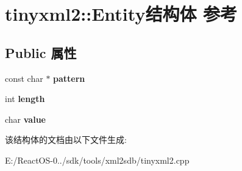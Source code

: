 \hypertarget{structtinyxml2_1_1_entity}{}\section{tinyxml2\+:\+:Entity结构体 参考}
\label{structtinyxml2_1_1_entity}
\subsection*{Public 属性}
\begin{DoxyCompactItemize}
\item 
\mbox{\label{structtinyxml2_1_1_entity_ab330f5d665d29bfc811ecfa76315894b}} 
const char $\ast$ {\bfseries pattern}
\item 
\mbox{\label{structtinyxml2_1_1_entity_a25e2b57cb59cb4fa68f283d7cb570f21}} 
int {\bfseries length}
\item 
\mbox{\label{structtinyxml2_1_1_entity_a7334e81e33b4615655a403711b24f3ed}} 
char {\bfseries value}
\end{DoxyCompactItemize}


该结构体的文档由以下文件生成\+:\begin{DoxyCompactItemize}
\item 
E\+:/\+React\+O\+S-\/0../sdk/tools/xml2sdb/tinyxml2.\+cpp\end{DoxyCompactItemize}
